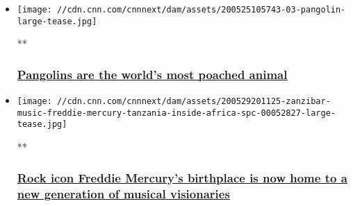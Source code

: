 \begin{itemize}
\item
  \href{/videos/world/2019/10/21/inside-africa-african-pangolin-sub-saharan-africa-mammal.cnn}{}

  \texttt{[image: //cdn.cnn.com/cnnnext/dam/assets/200525105743-03-pangolin-large-tease.jpg]}

  **

  \hypertarget{pangolins-are-the-worlds-most-poached-animal}{%
  \subsubsection{\texorpdfstring{\href{/videos/world/2019/10/21/inside-africa-african-pangolin-sub-saharan-africa-mammal.cnn}{Pangolins
  are the world's most poached
  animal}}{Pangolins are the world's most poached animal}}\label{pangolins-are-the-worlds-most-poached-animal}}
\end{itemize}

\begin{itemize}
\item
  \href{/videos/world/2020/05/29/zanzibar-music-freddie-mercury-tanzania-inside-africa-spc.cnn}{}

  \texttt{[image: //cdn.cnn.com/cnnnext/dam/assets/200529201125-zanzibar-music-freddie-mercury-tanzania-inside-africa-spc-00052827-large-tease.jpg]}

  **

  \hypertarget{rock-icon-freddie-mercurys-birthplace-is-now-home-to-a-new-generation-of-musical-visionaries}{%
  \subsubsection{\texorpdfstring{\href{/videos/world/2020/05/29/zanzibar-music-freddie-mercury-tanzania-inside-africa-spc.cnn}{Rock
  icon Freddie Mercury's birthplace is now home to a new generation of
  musical
  visionaries}}{Rock icon Freddie Mercury's birthplace is now home to a new generation of musical visionaries}}\label{rock-icon-freddie-mercurys-birthplace-is-now-home-to-a-new-generation-of-musical-visionaries}}
\end{itemize}

